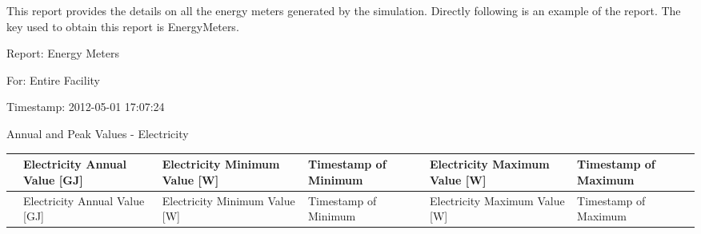 This report provides the details on all the energy meters generated by the simulation. Directly following is an example of the report. The key used to obtain this report is EnergyMeters.

Report: Energy Meters

For: Entire Facility

Timestamp: 2012-05-01 17:07:24

Annual and Peak Values - Electricity

{\scriptsize
\begin{longtable}[c]{>{\raggedright}p{1.5in}>{\raggedright}p{0.9in}>{\raggedright}p{0.9in}>{\raggedright}p{0.9in}>{\raggedright}p{0.9in}>{\raggedright}p{0.9in}}
\toprule 
 & Electricity Annual Value [GJ] & Electricity Minimum Value [W] & Timestamp of Minimum & Electricity Maximum Value [W] & Timestamp of Maximum \tabularnewline
\midrule
\endfirsthead

\toprule 
 & Electricity Annual Value [GJ] & Electricity Minimum Value [W] & Timestamp of Minimum & Electricity Maximum Value [W] & Timestamp of Maximum \tabularnewline
\midrule
\endhead


\end{longtable}}
